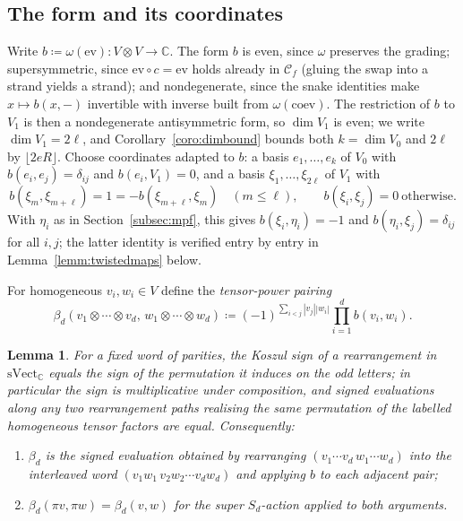 \documentclass[11pt]{article}
\newtheorem{lemm}[theo]{Lemma}
\newcommand{\conncat}{\mathcal{C}_{f}}            %
\newcommand{\fib}{\omega}                         %
\newcommand{\svect}{\mathrm{sVect}_{\mathbb{C}}}
\begin{document}
\subsection{The form and its coordinates}\label{subsec:formcoords}

Write $b\coloneqq\fib(\mathrm{ev})\colon V\otimes V\to\mathbb{C}$.
The form $b$ is even, since $\fib$ preserves the grading;
supersymmetric, since $\mathrm{ev}\circ c=\mathrm{ev}$ holds
already in $\conncat$ (gluing the swap into a strand yields a
strand); and nondegenerate, since the snake identities make
$x\mapsto b(x,-)$ invertible with inverse built from
$\fib(\mathrm{coev})$. The restriction of $b$ to $V_{1}$ is then a
nondegenerate antisymmetric form, so $\dim V_{1}$ is even; we
write $\dim V_{1}=2\ell$, and Corollary~\ref{coro:dimbound} bounds
both $k=\dim V_{0}$ and $2\ell$ by $\lfloor 2eR\rfloor$. Choose
coordinates
adapted to $b$: a basis $e_{1},\dotsc,e_{k}$ of $V_{0}$ with
$b(e_{i},e_{j})=\delta_{ij}$ and $b(e_{i},V_{1})=0$, and a basis
$\xi_{1},\dotsc,\xi_{2\ell}$ of $V_{1}$ with
\[
b(\xi_{m},\xi_{m+\ell})=1=-b(\xi_{m+\ell},\xi_{m})
\quad(m\le\ell),
\qquad
b(\xi_{i},\xi_{j})=0\ \text{otherwise}.
\]
With $\eta_{i}$ as in Section~\ref{subsec:mpf}, this gives
$b(\xi_{i},\eta_{i})=-1$ and $b(\eta_{i},\xi_{j})=\delta_{ij}$
for all $i,j$; the latter identity is verified entry by entry in
Lemma~\ref{lemm:twistedmaps} below.

For homogeneous $v_{i},w_{i}\in V$ define the
\emph{tensor-power pairing}
\[
\beta_{d}(v_{1}\otimes\dotsb\otimes v_{d},\,
w_{1}\otimes\dotsb\otimes w_{d})
\coloneqq
(-1)^{\sum_{i<j}|v_{j}||w_{i}|}\prod_{i=1}^{d}b(v_{i},w_{i}).
\]

\begin{lemm}\label{lemm:koszul}
For a fixed word of parities, the Koszul sign of a rearrangement
in $\svect$ equals the sign of the permutation it induces on the
odd letters; in particular the sign is multiplicative under
composition, and signed evaluations along any two rearrangement
paths realising the same permutation of the labelled homogeneous
tensor factors are equal. Consequently:
\begin{enumerate}
\item[(a)] $\beta_{d}$ is the signed evaluation obtained by
  rearranging $(v_{1}\dotsm v_{d}\,w_{1}\dotsm w_{d})$ into the
  interleaved word $(v_{1}w_{1}\,v_{2}w_{2}\dotsm v_{d}w_{d})$
  and applying $b$ to each adjacent pair;
\item[(b)] $\beta_{d}(\pi v,\pi w)=\beta_{d}(v,w)$ for the super
  $S_{d}$-action applied to both arguments.
\end{enumerate}
\end{lemm}
\end{document}
